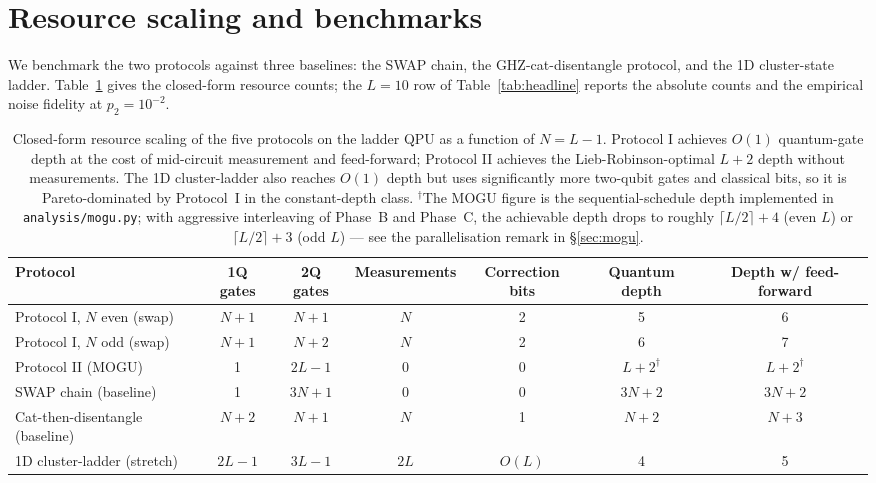 \documentclass[11pt,a4paper]{article}
\theoremstyle{definition}
\begin{document}
\section{Resource scaling and benchmarks}
\label{sec:resources}

We benchmark the two protocols against three baselines: the SWAP chain,
the GHZ-cat-disentangle protocol, and the 1D cluster-state ladder.
Table~\ref{tab:resources} gives the closed-form resource counts; the
$L=10$ row of Table~\ref{tab:headline} reports the absolute counts and
the empirical noise fidelity at $p_2=10^{-2}$.

\begin{table}[h]
\centering
\small
\begin{adjustbox}{max width=\textwidth}
\begin{tabular}{l|c c c c c c}
  \toprule
  \textbf{Protocol} & \textbf{1Q gates} & \textbf{2Q gates} &
  \textbf{Measurements} & \textbf{Correction bits} &
  \textbf{Quantum depth} & \textbf{Depth w/ feed-forward}\\
  \midrule
  Protocol I, $N$ even (swap) & $N+1$ & $N+1$ & $N$ & 2 & 5 & 6\\
  Protocol I, $N$ odd (swap)  & $N+1$ & $N+2$ & $N$ & 2 & 6 & 7\\
  Protocol II (MOGU)          & 1     & $2L-1$ & 0 & 0 & $L+2^{\dagger}$ & $L+2^{\dagger}$\\
  \midrule
  SWAP chain (baseline) & 1 & $3N+1$ & 0 & 0 & $3N+2$ & $3N+2$\\
  Cat-then-disentangle (baseline) & $N+2$ & $N+1$ & $N$ & 1 & $N+2$ & $N+3$\\
  1D cluster-ladder (stretch) & $2L-1$ & $3L-1$ & $2L$ & $O(L)$ & 4 & 5\\
  \bottomrule
\end{tabular}
\end{adjustbox}
\caption{Closed-form resource scaling of the five protocols on the
  ladder QPU as a function of $N=L-1$. Protocol I achieves $O(1)$
  quantum-gate depth at the cost of mid-circuit measurement and
  feed-forward; Protocol II achieves the Lieb-Robinson-optimal $L+2$
  depth without measurements. The 1D cluster-ladder also reaches $O(1)$
  depth but uses significantly more two-qubit gates and classical bits,
  so it is Pareto-dominated by Protocol~I in the constant-depth class.
  $^{\dagger}$The MOGU figure is the sequential-schedule depth implemented
  in \texttt{analysis/mogu.py}; with aggressive interleaving of Phase~B
  and Phase~C, the achievable depth drops to roughly $\lceil L/2\rceil+4$
  (even $L$) or $\lceil L/2\rceil+3$ (odd $L$) — see the parallelisation
  remark in \S\ref{sec:mogu}.}
\label{tab:resources}
\end{table}
\end{document}
